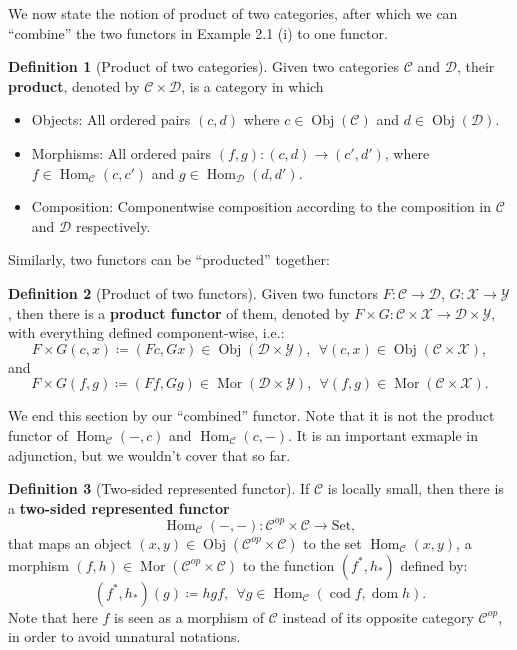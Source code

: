 \documentclass{article}
\theoremstyle{definition}
\newtheorem{definition}{Definition}[section]
\theoremstyle{definition}
\theoremstyle{remark}
\DeclareMathOperator{\Obj}{Obj}
\DeclareMathOperator{\Mor}{Mor}
\DeclareMathOperator{\dom}{dom}
\DeclareMathOperator{\cod}{cod}
\DeclareMathOperator{\Hom}{Hom}
\begin{document}
	We now state the notion of product of two categories, after which we can ``combine'' the two functors in Example 2.1 (i) to one functor.
	\begin{definition}[Product of two categories]
	Given two categories $\mathcal{C}$ and $\mathcal{D}$, their \textbf{product}, denoted by $\mathcal{C}\times\mathcal{D}$, is a category in which
	\begin{itemize}
		\item Objects: All ordered pairs $(c,d)$ where $c\in\Obj(\mathcal{C})$ and $d\in\Obj(\mathcal{D})$.
		\item Morphisms: All ordered pairs $(f,g):(c,d)\to (c',d')$, where $f\in\Hom_\mathcal{C}(c,c')$ and $g\in\Hom_\mathcal{D}(d,d')$.
		\item Composition: Componentwise composition according to the composition in $\mathcal{C}$ and $\mathcal{D}$ respectively.
	\end{itemize}
	\end{definition} 
	Similarly, two functors can be ``producted'' together:
	\begin{definition}[Product of two functors]
	Given two functors $F:\mathcal{C}\to \mathcal{D}$, $G:\mathcal{X}\to\mathcal{Y}$, then there is a \textbf{product functor} of them, denoted by $F\times G:\mathcal{C}\times\mathcal{X}\to\mathcal{D}\times\mathcal{Y}$, with everything defined component-wise, i.e.:
	\[F\times G(c,x)\coloneqq (Fc,Gx)\in\Obj(\mathcal{D}\times\mathcal{Y}),\ \ \forall (c,x)\in\Obj(\mathcal{C}\times\mathcal{X}),\]
	and 
	\[F\times G(f,g)\coloneqq (Ff,Gg)\in\Mor(\mathcal{D}\times\mathcal{Y}),\ \ \forall (f,g)\in\Mor(\mathcal{C}\times\mathcal{X}).\]
	\end{definition}
	We end this section by our ``combined'' functor. Note that it is not the product functor of $\Hom_\mathcal{C}(-,c)$ and $\Hom_\mathcal{C}(c,-)$. It is an important exmaple in adjunction, but we wouldn't cover that so far.
	\begin{definition}[Two-sided represented functor]
	If $\mathcal{C}$ is locally small, then there is a \textbf{two-sided represented functor} 
	\[\Hom_\mathcal{C}(-,-):\mathcal{C}^{op}\times \mathcal{C}\to \mathrm{Set},\]
	that maps an object $(x,y)\in\Obj(\mathcal{C}^{op}\times \mathcal{C})$ to the set $\Hom_\mathcal{C}(x,y)$, a morphism $(f,h)\in\Mor(\mathcal{C}^{op}\times \mathcal{C})$ to the function $(f^*,h_*)$ defined by:
	\[(f^*,h_*)(g)\coloneqq hgf,\ \ \forall g\in\Hom_\mathcal{C}(\cod f,\dom h).\]
	Note that here $f$ is seen as a morphism of $\mathcal{C}$ instead of its opposite category $\mathcal{C}^{op}$, in order to avoid unnatural notations.
	\end{definition}
\newpage
\end{document}
